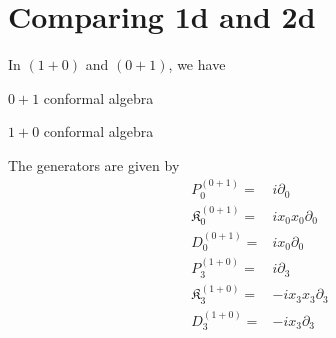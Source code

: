 \documentclass[]{article}
\numberwithin{equation}{section}
\begin{document}
{{\section{Comparing 1d and 2d}
In $(1+0)$ and $(0+1)$, we have
\begin{table}[h!]
  \centering
  \begin{subtable}[t]{0.45\textwidth}
    \centering
    \caption{$0+1$ conformal algebra}
    \label{tabelinterpolationifd:01}
  \end{subtable}
  \begin{subtable}[t]{0.45\textwidth}
    \centering
    \caption{$1+0$ conformal algebra}
    \label{tabelinterpolationifd:10}
  \end{subtable}
  \caption{Comparison of the $0+1$ and $1+0$ conformal algebras}
  \label{tabelinterpolationifd:both}
\end{table}

The generators are given by
\begin{align}
    P^{(0+1)}_{0}=&i\partial_{0}\\
    \mathfrak{K}^{(0+1)}_{{0}}=&ix_{0}x_{0}\partial_{{0}}\\
    D^{(0+1)}_{0}=&ix_{0}\partial_{0}\\
    P^{(1+0)}_{3}=&i\partial_{3}\\
    \mathfrak{K}^{(1+0)}_{{3}}=&-ix_{3}x_{3}\partial_{{3}}\\
    D^{(1+0)}_{3}=&-ix_{3}\partial_{3}
\end{align}

}}
\end{document}
